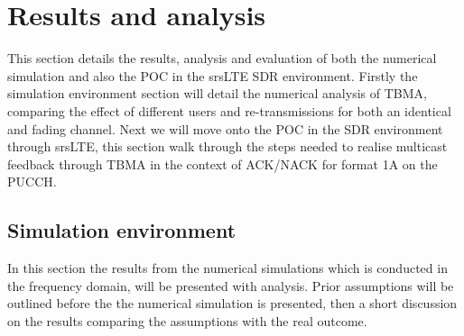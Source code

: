 \documentclass{article}
\begin{document}


\section{Results and analysis}\label{sim_results}

This section details the results, analysis and evaluation of both the numerical simulation and also the \ac{POC} in the srsLTE SDR environment. Firstly the simulation environment section will detail the numerical analysis of TBMA, comparing the effect of different users and re-transmissions for both an identical and fading channel. Next we will move onto the \ac{POC} in the SDR environment through srsLTE, this section walk through the steps needed to realise multicast feedback through TBMA in the context of ACK/NACK for format 1A on the PUCCH.  

\subsection{Simulation environment}
In this section the results from the numerical simulations which is conducted in the frequency domain, will be presented with analysis. Prior assumptions will be outlined before the the numerical simulation is presented, then a short discussion on the results comparing the assumptions with the real outcome. 
\end{document}

